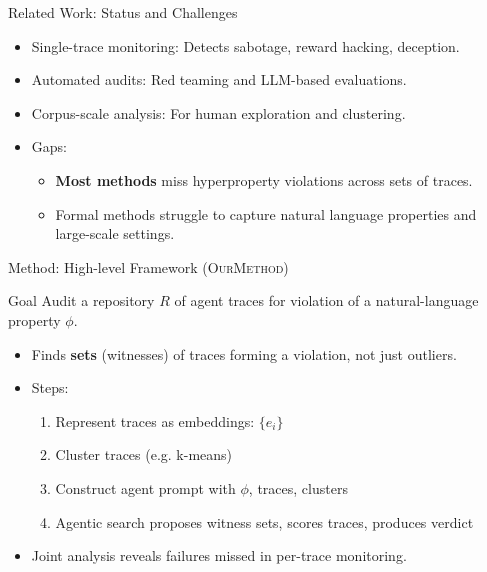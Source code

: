 \documentclass{beamer}
\newcommand{\alertterm}[1]{\alert{#1}}
\begin{document}
\begin{frame}{Related Work: Status and Challenges}
\begin{itemize}
    \item \alertterm{Single-trace monitoring}: Detects sabotage, reward hacking, deception.
    \item \alertterm{Automated audits}: Red teaming and LLM-based evaluations.
    \item \alertterm{Corpus-scale analysis}: For human exploration and clustering.
    \item Gaps:
    \begin{itemize}
        \item \textbf{Most methods} miss \alertterm{hyperproperty violations} across sets of traces.
        \item \alertterm{Formal methods} struggle to capture natural language properties and large-scale settings.
    \end{itemize}
\end{itemize}
\end{frame}

\begin{frame}{Method: High-level Framework (\textsc{OurMethod})}
\begin{block}{Goal}
Audit a \alertterm{repository} $R$ of agent traces for violation of a natural-language property $\phi$.
\end{block}
\begin{itemize}
    \item Finds \textbf{sets} (witnesses) of traces forming a violation, not just outliers.
    \item Steps:
    \begin{enumerate}
        \item Represent traces as embeddings: $\{e_i\}$
        \item \alertterm{Cluster} traces (e.g. k-means)
        \item Construct agent prompt with $\phi$, traces, clusters
        \item \alertterm{Agentic search} proposes witness sets, scores traces, produces verdict
    \end{enumerate}
    \item \alertterm{Joint analysis} reveals failures missed in per-trace monitoring.
\end{itemize}
\end{frame}
\end{document}
